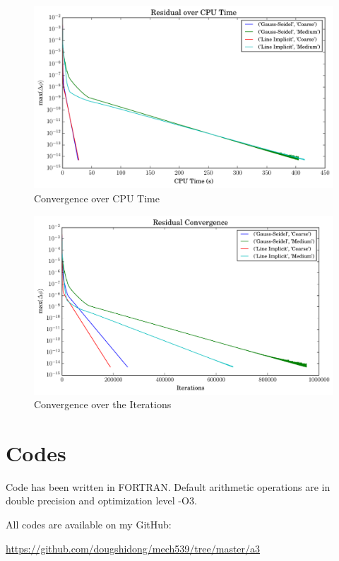 \documentclass[letterpaper,12pt,]{article}
\begin{document}
\begin{figure}[!htbp]
    \centering
    \includegraphics[width=\linewidth]{./Figures/q4time.pdf}
    \caption{Convergence over CPU Time}
    \label{fig:q4time}
\end{figure}

\begin{figure}[!htbp]
    \centering
    \includegraphics[width=\linewidth]{./Figures/q4res.pdf}
    \caption{Convergence over the Iterations}
    \label{fig:q4res}
\end{figure}

\clearpage
\section*{Codes}

Code has been written in FORTRAN. Default arithmetic operations are in double precision and optimization level -O3.

All codes are available on my GitHub:

\url{https://github.com/dougshidong/mech539/tree/master/a3}
\end{document}
